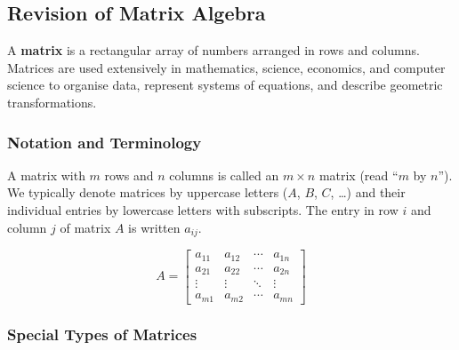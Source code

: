 
\subsection{Revision of Matrix Algebra}

A \textbf{matrix} is a rectangular array of numbers arranged in rows and columns. Matrices are used extensively in mathematics, science, economics, and computer science to organise data, represent systems of equations, and describe geometric transformations.

\subsubsection*{Notation and Terminology}

A matrix with $m$ rows and $n$ columns is called an $m \times n$ matrix (read ``$m$ by $n$''). We typically denote matrices by uppercase letters ($A$, $B$, $C$, \ldots) and their individual entries by lowercase letters with subscripts. The entry in row $i$ and column $j$ of matrix $A$ is written $a_{ij}$.

\[
A = \begin{bmatrix} a_{11} & a_{12} & \cdots & a_{1n} \\ a_{21} & a_{22} & \cdots & a_{2n} \\ \vdots & \vdots & \ddots & \vdots \\ a_{m1} & a_{m2} & \cdots & a_{mn} \end{bmatrix}
\]

\subsubsection*{Special Types of Matrices}

